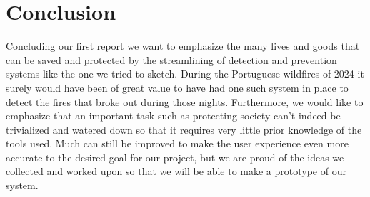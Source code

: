\chapter*{Conclusion}
Concluding our first report we want to emphasize the many lives and goods that can be saved and protected by the streamlining of detection and prevention systems like the one we tried to sketch. During the Portuguese wildfires of 2024 it surely would have been of great value to have had one such system in place to detect the fires that broke out during those nights. Furthermore, we would like to emphasize that an important task such as protecting society can’t indeed be trivialized and watered down so that it requires very little prior knowledge of the tools used. Much can still be improved to make the user experience even more accurate to the desired goal for our project, but we are proud of the ideas we collected and worked upon so that we will be able to make a prototype of our system.
